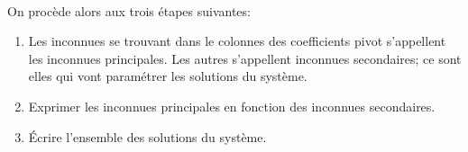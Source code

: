 \paragraph{}On procède alors aux trois étapes suivantes:
\begin{enumerate}
  \item Les inconnues se trouvant dans le colonnes des coefficients pivot s'appellent les inconnues principales. Les autres s'appellent inconnues secondaires; ce sont elles qui vont paramétrer les solutions du système.
  \item Exprimer les inconnues principales en fonction des inconnues secondaires.
  \item Écrire l'ensemble des solutions du système.
\end{enumerate}

